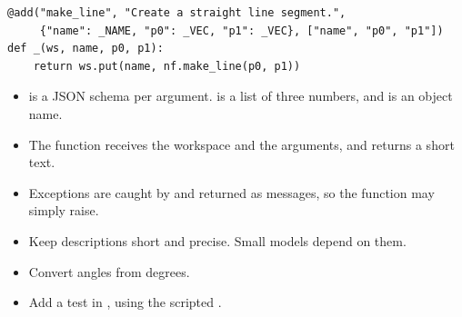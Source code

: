 \begin{lstlisting}[style=python]
@add("make_line", "Create a straight line segment.",
     {"name": _NAME, "p0": _VEC, "p1": _VEC}, ["name", "p0", "p1"])
def _(ws, name, p0, p1):
    return ws.put(name, nf.make_line(p0, p1))
\end{lstlisting}

\begin{itemize}
  \item {} is a JSON schema per argument.  is a list of three numbers,
    and  is an object name.
  \item The function receives the workspace and the arguments, and returns a short text.
  \item Exceptions are caught by  and returned as  messages, so
    the function may simply raise.
  \item Keep descriptions short and precise. Small models depend on them.
  \item Convert angles from degrees.
  \item Add a test in , using the scripted .
\end{itemize}

